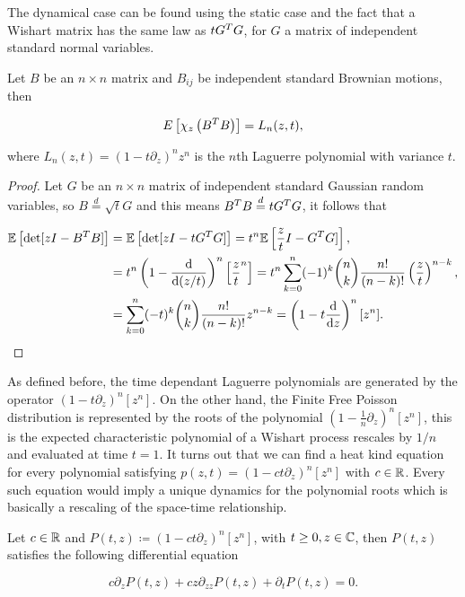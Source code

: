     The dynamical case can be found using the static case and the fact that a Wishart matrix has the same law as $tG^TG$, for $G$ a matrix of independent standard normal variables.

\begin{theorem} \label{thm:wishart_is_laguerre}
    Let $B$ be an $n\times n$ matrix and $B_{ij}$ be independent standard Brownian motions, then 

    \begin{equation*}
        E\left[ \chi_z\left( B^TB\right) \right] = L_n(z,t),
    \end{equation*}

    \noindent where $L_n(z,t) = \left( 1 - t\partial_z \right)^n z^n$ is the $n$th Laguerre polynomial with variance $t$.
\end{theorem}

\begin{proof}
    Let $G$ be an $n\times n$ matrix of independent standard Gaussian random variables, so $B \overset{d}{=} \sqrt{t}G$ and this means $B^TB \overset{d}{=} t G^T G$, it follows that

    \begin{align*}
        \mathbb E \left[ \det[zI - B^T B] \right] &= \mathbb E \left[ \det[zI - t G^T G] \right] = t^n \mathbb E \left[ \frac zt I - G^TG] \right], \\
        &= t^n \left(1 - \frac{\mathrm d }{\mathrm d (z/t)}\right)^n\left[ \frac{z}{t}^n\right] = t^n\sum_{k=0}^n (-1)^k \binom nk \frac{n!}{(n-k)!} \left(\frac zt\right)^{n-k},\\
        &= \sum_{k=0}^n (-t)^k \binom nk \frac{n!}{(n-k)!} z^{n-k} = \left( 1 - t\frac{\mathrm d}{\mathrm d z} \right)^n [z^n].
    \end{align*}
\end{proof}

    As defined before, the time dependant Laguerre polynomials are generated by the operator $(1-t\partial_z)^{n}[z^n]$. On the other hand, the Finite Free Poisson distribution is represented by the roots of the polynomial $(1-\frac1n\partial_z)^{n}[z^n]$, this is the expected characteristic polynomial of a Wishart process rescales by $1/n$ and evaluated at time $t=1$. It turns out that we can find a heat kind equation for every polynomial satisfying $p(z,t)=(1-ct\partial_z)^n[z^n]$ with $c \in\mathbb R$. Every such equation would imply a unique dynamics for the polynomial roots which is basically a rescaling of the space-time relationship.

\begin{theorem}
    Let $c\in \mathbb R$ and $P(t,z) \coloneqq \left( 1 - ct\partial_z \right)^n [z^n]$, with $t\ge 0, z \in \mathbb C$, then $P(t,z)$ satisfies the following differential equation

    \begin{equation*} 
        c\partial_z P(t,z) + cz  \partial_{zz}P(t,z) + \partial_t P(t,z) = 0.
     \end{equation*}

\end{theorem}

